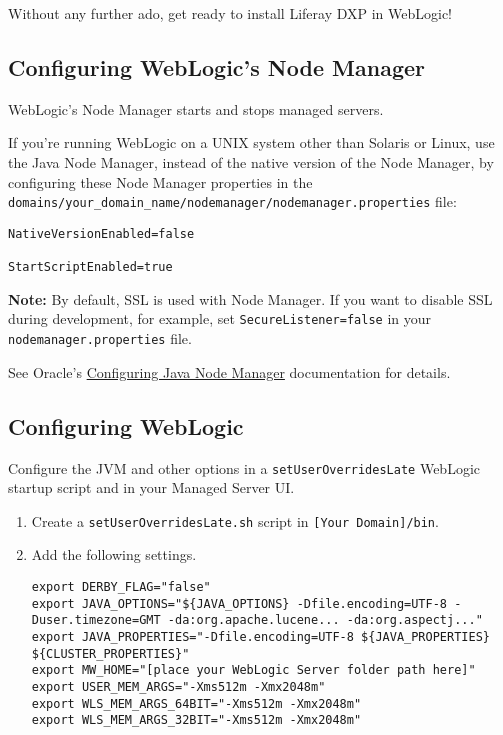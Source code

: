 \noindent\hrulefill

Without any further ado, get ready to install Liferay DXP in WebLogic!

\subsection{Configuring WebLogic's Node
Manager}\label{configuring-weblogics-node-manager}

WebLogic's Node Manager starts and stops managed servers.

If you're running WebLogic on a UNIX system other than Solaris or Linux,
use the Java Node Manager, instead of the native version of the Node
Manager, by configuring these Node Manager properties in the
\texttt{domains/your\_domain\_name/nodemanager/nodemanager.properties}
file:

\begin{verbatim}
NativeVersionEnabled=false

StartScriptEnabled=true
\end{verbatim}

\noindent\hrulefill

\textbf{Note:} By default, SSL is used with Node Manager. If you want to
disable SSL during development, for example, set
\texttt{SecureListener=false} in your \texttt{nodemanager.properties}
file.

\noindent\hrulefill

See Oracle's
\href{https://docs.oracle.com/middleware/1212/wls/NODEM/java_nodemgr.htm\#NODEM173}{Configuring
Java Node Manager} documentation for details.

\subsection{Configuring WebLogic}\label{configuring-weblogic}

Configure the JVM and other options in a \texttt{setUserOverridesLate}
WebLogic startup script and in your Managed Server UI.

\begin{enumerate}
\def\labelenumi{\arabic{enumi}.}
\item
  Create a \texttt{setUserOverridesLate.sh} script in
  \texttt{{[}Your\ Domain{]}/bin}.
\item
  Add the following settings.

\begin{verbatim}
export DERBY_FLAG="false"
export JAVA_OPTIONS="${JAVA_OPTIONS} -Dfile.encoding=UTF-8 -Duser.timezone=GMT -da:org.apache.lucene... -da:org.aspectj..."
export JAVA_PROPERTIES="-Dfile.encoding=UTF-8 ${JAVA_PROPERTIES} ${CLUSTER_PROPERTIES}"
export MW_HOME="[place your WebLogic Server folder path here]"
export USER_MEM_ARGS="-Xms512m -Xmx2048m"
export WLS_MEM_ARGS_64BIT="-Xms512m -Xmx2048m"
export WLS_MEM_ARGS_32BIT="-Xms512m -Xmx2048m"
\end{verbatim}
\end{enumerate}


